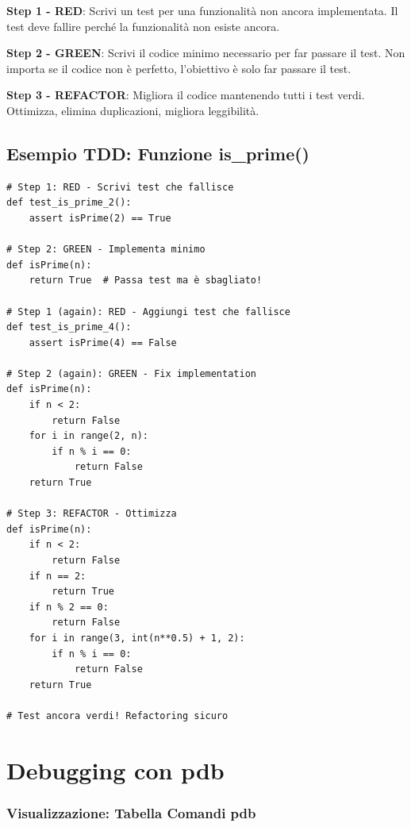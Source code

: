 \textbf{Step 1 - RED}: Scrivi un test per una funzionalità non ancora implementata. Il test deve fallire perché la funzionalità non esiste ancora.

\textbf{Step 2 - GREEN}: Scrivi il codice minimo necessario per far passare il test. Non importa se il codice non è perfetto, l'obiettivo è solo far passare il test.

\textbf{Step 3 - REFACTOR}: Migliora il codice mantenendo tutti i test verdi. Ottimizza, elimina duplicazioni, migliora leggibilità.

\subsection{Esempio TDD: Funzione is\_prime()}

\begin{lstlisting}
# Step 1: RED - Scrivi test che fallisce
def test_is_prime_2():
    assert isPrime(2) == True

# Step 2: GREEN - Implementa minimo
def isPrime(n):
    return True  # Passa test ma è sbagliato!

# Step 1 (again): RED - Aggiungi test che fallisce
def test_is_prime_4():
    assert isPrime(4) == False

# Step 2 (again): GREEN - Fix implementation
def isPrime(n):
    if n < 2:
        return False
    for i in range(2, n):
        if n % i == 0:
            return False
    return True

# Step 3: REFACTOR - Ottimizza
def isPrime(n):
    if n < 2:
        return False
    if n == 2:
        return True
    if n % 2 == 0:
        return False
    for i in range(3, int(n**0.5) + 1, 2):
        if n % i == 0:
            return False
    return True

# Test ancora verdi! Refactoring sicuro
\end{lstlisting}

\section{Debugging con pdb}

\subsubsection{Visualizzazione: Tabella Comandi pdb}

